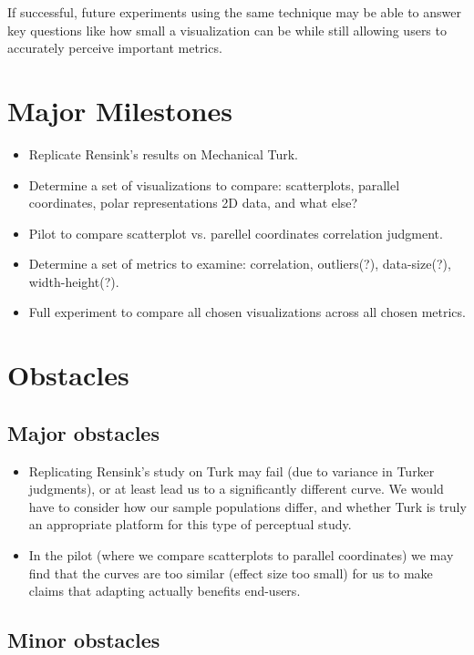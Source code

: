 \documentclass{proc}
\begin{document}
If successful, future experiments using the same technique may be able to answer key questions like how small a visualization can be while still allowing users to accurately perceive important metrics.

\section{Major Milestones}

\begin{itemize}
\item Replicate Rensink's results on Mechanical Turk.
\item Determine a set of visualizations to compare: scatterplots, parallel coordinates, polar representations 2D data, and what else?
\item Pilot to compare scatterplot vs. parellel coordinates correlation judgment.
\item Determine a set of metrics to examine: correlation, outliers(?), data-size(?), width-height(?).
\item Full experiment to compare all chosen visualizations across all chosen metrics.
\end{itemize}

\section{Obstacles}

\subsection{Major obstacles} %

\begin{itemize}
\item Replicating Rensink's study on Turk may fail (due to variance in Turker judgments), or at least lead us to a significantly different curve. We would have to consider how our sample populations differ, and whether Turk is truly an appropriate platform for this type of perceptual study.
\item In the pilot (where we compare scatterplots to parallel coordinates) we may find that the curves are too similar (effect size too small) for us to make claims that adapting actually benefits end-users.
\end{itemize}

\subsection{Minor obstacles}
\end{document}
